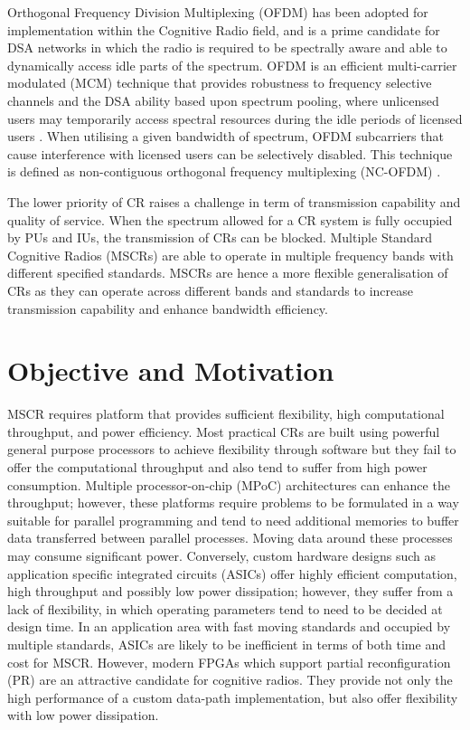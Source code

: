 Orthogonal Frequency Division Multiplexing (OFDM) has been adopted for implementation within the Cognitive Radio field, and is a prime candidate for DSA networks in which the radio is required to be spectrally aware and able to dynamically access idle parts of the spectrum. 
OFDM is an efficient multi-carrier modulated (MCM) technique that provides robustness to frequency selective channels and the DSA ability based upon spectrum pooling, where unlicensed users may temporarily access spectral resources during the idle periods of licensed users \cite{JondralMarch2004}. 
When utilising a given bandwidth of spectrum, OFDM subcarriers that cause interference with licensed users can be selectively disabled.
This technique is defined as non-contiguous orthogonal frequency multiplexing (NC-OFDM) \cite{MindenJune2006}.

The lower priority of CR raises a challenge in term of transmission capability and quality of service. When the spectrum allowed for a CR system is fully occupied by PUs and IUs, the transmission of CRs can be blocked.
Multiple Standard Cognitive Radios (MSCRs) are able to operate in multiple frequency bands with different specified standards.
MSCRs are hence a more flexible generalisation of CRs as they can operate across different bands and standards to increase transmission capability and enhance bandwidth efficiency.

\section{Objective and Motivation}

MSCR requires platform that provides sufficient flexibility, high computational throughput, and power efficiency.
Most practical CRs are built using powerful general purpose processors to achieve flexibility through software but they fail to offer the computational throughput and also tend to suffer from high power consumption.
Multiple processor-on-chip (MPoC) architectures can enhance the throughput; 
however, these platforms require problems to be formulated in a way suitable for parallel programming and tend to need additional memories to buffer data transferred between parallel processes.
Moving data around these processes may consume significant power. 
Conversely, custom hardware designs such as application specific integrated circuits (ASICs) offer highly efficient computation, high throughput and possibly low power dissipation; however, they suffer from a lack of flexibility, in which operating parameters tend to need to be decided at design time. 
In an application area with fast moving standards and occupied by multiple standards, ASICs are likely to be inefficient in terms of both time and cost for MSCR.
However, modern FPGAs which support partial reconfiguration (PR) are an attractive candidate for cognitive radios.
They provide not only the high performance of a custom data-path implementation, but also offer flexibility with low power dissipation. 

